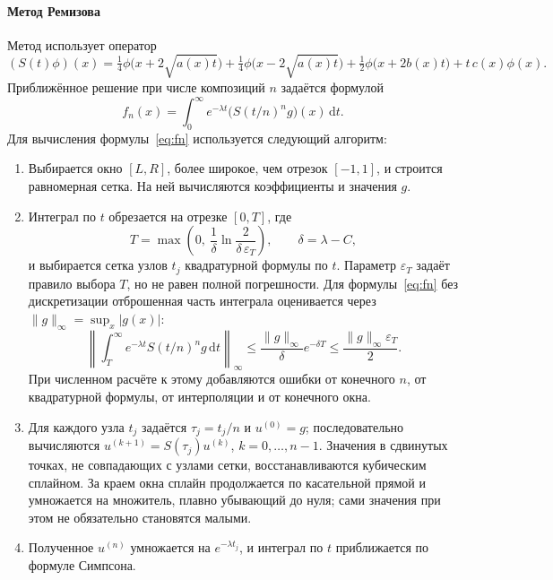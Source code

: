\documentclass[14pt,a4paper]{extarticle}
\newcommand{\dd}{\mathrm{d}}
\begin{document}
\paragraph{Метод Ремизова\\}
Метод использует оператор
\[
(S(t)\phi)(x)=\tfrac14\phi\bigl(x+2\sqrt{a(x)t}\bigr)
+\tfrac14\phi\bigl(x-2\sqrt{a(x)t}\bigr)
+\tfrac12\phi\bigl(x+2b(x)t\bigr)+t\,c(x)\phi(x).
\]
Приближённое решение при числе композиций $n$ задаётся формулой
\begin{equation}\label{eq:fn}
f_n(x)=\int_0^\infty e^{-\lambda t}\bigl(S(t/n)^ng\bigr)(x)\,\dd t.
\end{equation}
Для вычисления формулы~\eqref{eq:fn} используется следующий алгоритм:
\begin{enumerate}
\item Выбирается окно $[L,R]$, более широкое, чем отрезок $[-1,1]$,
и строится равномерная сетка. На ней вычисляются коэффициенты
и значения $g$.
\item Интеграл по $t$ обрезается на отрезке $[0,T]$, где
\[
T=\max\left(0,\ \frac1\delta\ln\frac{2}{\delta\,\varepsilon_T}\right),
\qquad \delta=\lambda-C,
\]
и выбирается сетка узлов $t_j$ квадратурной формулы по $t$.
Параметр $\varepsilon_T$ задаёт правило выбора $T$, но не равен полной
погрешности. Для формулы~\eqref{eq:fn} без дискретизации отброшенная
часть интеграла оценивается через $\|g\|_\infty=\sup_x|g(x)|$:
\[
\left\|\int_T^\infty e^{-\lambda t}S(t/n)^ng\,\dd t\right\|_\infty
\le\frac{\|g\|_\infty}{\delta}e^{-\delta T}
\le\frac{\|g\|_\infty\varepsilon_T}{2}.
\]
При численном расчёте к этому добавляются ошибки от конечного $n$,
от квадратурной формулы, от интерполяции и от конечного окна.
\item Для каждого узла $t_j$ задаётся $\tau_j=t_j/n$ и $u^{(0)}=g$;
последовательно вычисляются $u^{(k+1)}=S(\tau_j)u^{(k)}$,
$k=0,\dots,n-1$. Значения в сдвинутых точках, не совпадающих с узлами
сетки, восстанавливаются кубическим сплайном. За краем окна сплайн
продолжается по касательной прямой и умножается на множитель,
плавно убывающий до нуля; сами значения при этом не обязательно
становятся малыми.
\item Полученное $u^{(n)}$ умножается на $e^{-\lambda t_j}$, и интеграл
по $t$ приближается по формуле Симпсона.
\end{enumerate}
\end{document}

